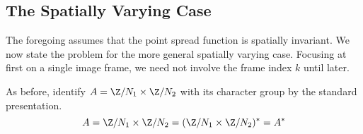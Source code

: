
\subsection{The Spatially Varying Case}\label{sec:spat-vary-case}
The foregoing assumes that the point spread function is spatially invariant.
We now state the problem for the more general spatially varying case.
Focusing at first on a single image frame, we need not involve the frame index $k$ 
until later.  

As before, identify $A = \Z/N_1 \times \Z/N_2$ with its character group by the
standard presentation.
\[
A = \Z/N_1 \times \Z/N_2 = 
(\Z/N_1 \times \Z/N_2)^* = A^*
\]

